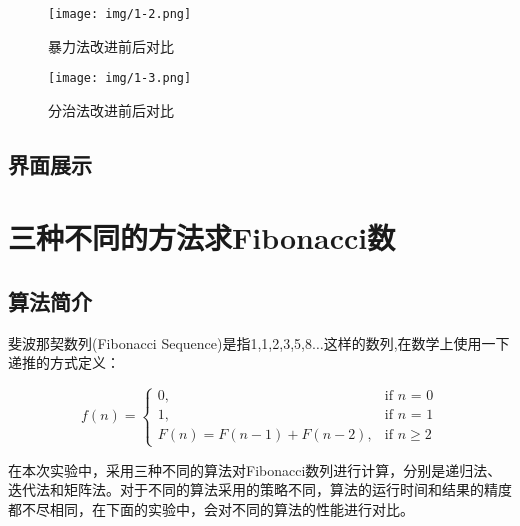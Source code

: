\documentclass[UTF8]{ctexart}
\begin{document}
\begin{figure}[htbp]

    \begin{minipage}[t]{0.5\textwidth} %
        
    \centering
    \texttt{[image: img/1-2.png]}
    \caption{暴力法改进前后对比}%
    \label{img1-2}
    \end{minipage}
    \begin{minipage}[t]{0.5\textwidth}
    \centering
    \texttt{[image: img/1-3.png]}
    \caption{分治法改进前后对比}
    \label{img1-3}
    \end{minipage}
       
\end{figure}

\subsection{界面展示}

\section{三种不同的方法求Fibonacci数}

\subsection{算法简介}
斐波那契数列(Fibonacci Sequence)是指1,1,2,3,5,8$\dots$这样的数列,在数学上使用一下递推的方式定义：

\begin{equation*}
    f(n) =
    \begin{cases}
    0, & \mbox{if }n\mbox{ = 0} \\
    1, & \mbox{if }n\mbox{ = 1} \\
    F(n)=F(n-1)+F(n-2), & \mbox{if }n \geq 2
    \end{cases}    
\end{equation*}

在本次实验中，采用三种不同的算法对Fibonacci数列进行计算，分别是递归法、迭代法和矩阵法。对于不同的算法采用的策略不同，算法的运行时间和结果的精度都不尽相同，在下面的实验中，会对不同的算法的性能进行对比。
\end{document}
